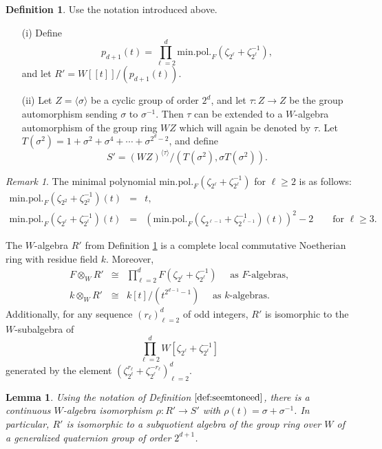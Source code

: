 \documentclass{amsart}
\theoremstyle{plain}
\newtheorem{lemma}[thm]{Lemma}
\theoremstyle{definition}
\newtheorem{dfn}[thm]{Definition}
\theoremstyle{remark}
\newtheorem{rem}[thm]{Remark}
\begin{document}
\begin{dfn}
\label{def:seemtoneed}
Use the notation introduced above.
\begin{enumerate}
\item[(i)] Define
$$p_{d+1}(t)=\prod_{\ell=2}^d \mathrm{min.pol.}_F(\zeta_{2^\ell}+\zeta_{2^\ell}^{-1}),$$
and let $R'=W[[t]]/(p_{d+1}(t))$.
\item[(ii)] Let $Z=\langle \sigma\rangle$ be a cyclic group of order $2^d$, and let $\tau:Z\to Z$ be the group automorphism sending $\sigma$ to $\sigma^{-1}$. Then $\tau$ can be extended to a $W$-algebra automorphism of the group ring $WZ$ which will again be denoted by $\tau$. Let $T(\sigma^2)=1+\sigma^2+\sigma^4+\cdots +\sigma^{2^d-2}$, and define
$$S'= (WZ)^{\langle \tau\rangle}/\left(T(\sigma^2),\sigma T(\sigma^2)\right).$$
\end{enumerate}
\end{dfn}

\begin{rem}
\label{rem:ohyeah}
The minimal polynomial $\mathrm{min.pol.}_F(\zeta_{2^\ell}+\zeta_{2^\ell}^{-1})$ for $\ell\ge 2$ is as follows:
\begin{eqnarray*}
\mathrm{min.pol.}_F(\zeta_{2^2}+\zeta_{2^2}^{-1})(t)&=&t,\\ \mathrm{min.pol.}_F(\zeta_{2^{\ell}}+\zeta_{2^{\ell}}^{-1})(t)
&=&\left(\mathrm{min.pol.}_F(\zeta_{2^{\ell-1}}+\zeta_{2^{\ell-1}}^{-1})(t)\right)^2-2 \qquad \mbox{for $\ell\ge 3$}.
\end{eqnarray*}

The $W$-algebra $R'$ from Definition \ref{def:seemtoneed} is a complete local 
commutative Noetherian ring with residue field $k$. Moreover, 
\begin{eqnarray*}
F\otimes_W R'&\cong& \prod_{\ell=2}^d F(\zeta_{2^\ell}+\zeta_{2^\ell}^{-1})\quad\mbox{ as $F$-algebras,}\\
k\otimes_W R'&\cong& k[t]/(t^{2^{d-1}-1})\quad\mbox{ as $k$-algebras.}
\end{eqnarray*}
Additionally, for any sequence $\left(r_\ell\right)_{\ell=2}^d$ of odd integers, $R'$ is isomorphic to the $W$-subalgebra of
$$\prod_{\ell=2}^d W[\zeta_{2^\ell}+\zeta_{2^\ell}^{-1}]$$
generated by the element 
$\left(\zeta_{2^\ell}^{r_\ell}+\zeta_{2^\ell}^{-r_\ell}\right)_{\ell=2}^d$.
\end{rem}

\begin{lemma}
\label{lem:quaterniontrick}
Using the notation of Definition $\ref{def:seemtoneed}$, there 
is a continuous $W$-algebra isomorphism $\rho:R'\to S'$ with $\rho(t)=\sigma+\sigma^{-1}$. 
In particular, $R'$ is isomorphic to a subquotient algebra of the group ring over $W$ of a
generalized quaternion group of order $2^{d+1}$.
\end{lemma}
\end{document}

